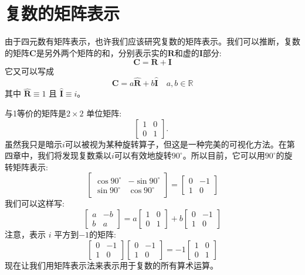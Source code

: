 \section{复数的矩阵表示}
由于四元数有矩阵表示，也许我们应该研究复数的矩阵表示。我们可以推断，复数的矩阵$\mathbf{C}$是另外两个矩阵的和，分别表示实的$\mathbf{R}$和虚的$\mathbf{I}$部分:
$$
\mathbf{C}=\mathbf{R}+\mathbf{I}
$$
它又可以写成
$$
\mathbf{C}=a \hat{\mathbf{R}}+b \hat{\mathbf{I}} \quad a, b \in \mathbb{R}
$$
其中 $\hat{\mathbf{R}} \equiv 1$ 且 $\hat{\mathbf{I}} \equiv i$。

与1等价的矩阵是$2 \times 2$ 单位矩阵:
$$
\left[\begin{array}{ll}
1 & 0 \\
0 & 1
\end{array}\right] \text {. }
$$
虽然我只是暗示$ i $可以被视为某种旋转算子，但这是一种完美的可视化方法。在第四章中，我们将发现复数乘以$i$可以有效地旋转$90^{\circ}$。所以目前，它可以用$90^{\circ}$的旋转矩阵表示:
$$
\left[\begin{array}{cc}
\cos 90^{\circ} & -\sin 90^{\circ} \\
\sin 90^{\circ} & \cos 90^{\circ}
\end{array}\right]=\left[\begin{array}{cc}
0 & -1 \\
1 & 0
\end{array}\right]
$$
我们可以这样写:
$$
\left[\begin{array}{cc}
a & -b \\
b & a
\end{array}\right]=a\left[\begin{array}{ll}
1 & 0 \\
0 & 1
\end{array}\right]+b\left[\begin{array}{cc}
0 & -1 \\
1 & 0
\end{array}\right]
$$
注意，表示 $i$ 平方到$-1$的矩阵:
$$
\left[\begin{array}{cc}
0 & -1 \\
1 & 0
\end{array}\right]\left[\begin{array}{cc}
0 & -1 \\
1 & 0
\end{array}\right]=-1\left[\begin{array}{ll}
1 & 0 \\
0 & 1
\end{array}\right]
$$
现在让我们用矩阵表示法来表示用于复数的所有算术运算。
